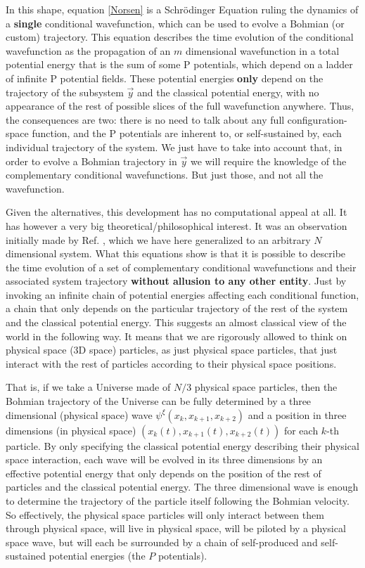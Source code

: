 \documentclass[11pt, a4paper]{article} %
\begin{document}
In this shape, equation \eqref{Norsen} is a Schrödinger Equation ruling the dynamics of a {\bf single} conditional wavefunction, which can be used to evolve a Bohmian (or custom) trajectory. This equation describes the time evolution of the conditional wavefunction as the propagation of an $m$ dimensional wavefunction in a total potential energy that is the sum of some P potentials, which depend on a ladder of infinite P potential fields. These potential energies {\bf only} depend on the trajectory of the subsystem $\vec{y}$ and the classical potential energy, with no appearance of the rest of possible slices of the full wavefunction anywhere. Thus, the consequences are two: there is no need to talk about any full configuration-space function, and the P potentials are inherent to, or self-sustained by, each individual trajectory of the system. We just have to take into account that, in order to evolve a Bohmian trajectory in $\vec{y}$ we will require the knowledge of the complementary conditional wavefunctions. But just those, and not all the wavefunction.

Given the alternatives, this development has no computational appeal at all. It has however a very big theoretical/philosophical interest. It was an observation initially made by Ref. \cite{Norsen}, which we have here generalized to an arbitrary $N$ dimensional system. What this equations show is that it is possible to describe the time evolution of a set of complementary conditional wavefunctions and their associated system trajectory {\bf without allusion to any other entity}. Just by invoking an infinite chain of potential energies affecting each conditional function, a chain that only depends on the particular trajectory of the rest of the system and the classical potential energy. This suggests an almost classical view of the world in the following way. It means that we are rigorously allowed to think on physical space (3D space) particles, as just physical space particles, that just interact with the rest of particles according to their physical space positions. 

That is, if we take a Universe made of $N/3$ physical space particles, then the Bohmian trajectory of the Universe can be fully determined by a three dimensional (physical space) wave $\psi^\xi(x_k,x_{k+1},x_{k+2})$ and a position in three dimensions (in physical space) $(x_k(t),x_{k+1}(t),x_{k+2}(t))$ for each $k$-th particle. By only specifying the classical potential energy describing their physical space interaction, each wave will be evolved in its three dimensions by an effective potential energy that only depends on the position of the rest of particles and the classical potential energy. The three dimensional wave is enough to determine the trajectory of the particle itself following the Bohmian velocity. So effectively, the physical space particles will only interact between them through physical space, will live in physical space, will be piloted by a physical space wave, but will each be surrounded by a chain of self-produced and self-sustained potential energies (the $P$ potentials).
\end{document}
